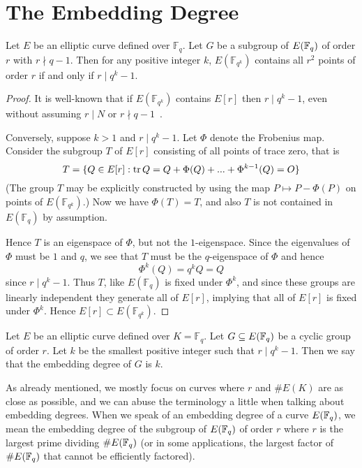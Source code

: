 \section {The Embedding Degree}

\begin{theorem}
Let $E$ be an elliptic curve defined over $\mathbb{F}_q$.
Let $G$ be a subgroup of $E(\mathbb{F}_q)$ of order $r$ with
$r \nmid q-1$.
Then for any positive integer $k$,
$E(\mathbb{F}_{q^k})$ contains all $r^2$
points of order $r$ if and only if $r \mid q^k - 1$.
\end{theorem}

\begin{proof}
It is well-known that if $E(\mathbb{F}_{q^k})$ contains $E[r]$
then $r \mid q^k - 1$, even without assuming $r \mid N$ or
$r \nmid q-1$~\cite{bk}.

Conversely, suppose $k > 1$ and $r \mid q^k - 1$.
Let $\Phi$ denote the Frobenius map. Consider the subgroup $T$ of $E[r]$
consisting of all points of trace zero, that is
\[
T = \{ Q \in E[r] : \mathop{\rm tr} Q = Q + \Phi(Q) + ... + \Phi^{k-1}(Q) = O \}
\]
(The group $T$ may be explicitly constructed by using the map $P \mapsto
P - \Phi(P)$ on points of $E(\mathbb{F}_{q^k})$.)
Now we have $\Phi(T) = T$, and also $T$ is not contained
in $E(\mathbb{F}_q)$ by assumption.

Hence $T$ is an eigenspace of $\Phi$, but not the $1$-eigenspace. Since the
eigenvalues of $\Phi$ must be $1$ and $q$, we see that $T$ must be the
$q$-eigenspace of $\Phi$ and hence
\[
\Phi^k(Q) = q^k Q = Q
\]
since $r \mid q^k - 1$. Thus $T$, like $E(\mathbb{F}_q)$ is fixed under
$\Phi^k$, and since these groups are linearly independent they generate all
of $E[r]$, implying that all of $E[r]$ is fixed under $\Phi^k$. Hence
$E[r] \subset E(\mathbb{F}_{q^k})$.
\end{proof}

\begin{definition}
Let $E$ be an elliptic curve defined over $K = \mathbb{F}_q$.
Let $G \subseteq E(\mathbb{F}_q)$ be a cyclic group of order $r$.
Let $k$ be the smallest positive integer such that $r \mid q^k - 1$.
Then we say that the embedding degree of $G$ is $k$.
\end{definition}

As already mentioned, we mostly focus on curves where
$r$ and $\#E(K)$ are as close as possible, and
we can abuse the terminology a little when talking about embedding degrees.
When we speak of an embedding degree
of a curve $E(\mathbb{F}_q)$, we mean the embedding degree of the subgroup of
$E(\mathbb{F}_q)$ of order $r$ where $r$ is the largest prime dividing $\#E(\mathbb{F}_q)$
(or in some applications, the largest factor of $\#E(\mathbb{F}_q)$ that cannot be
efficiently factored).


